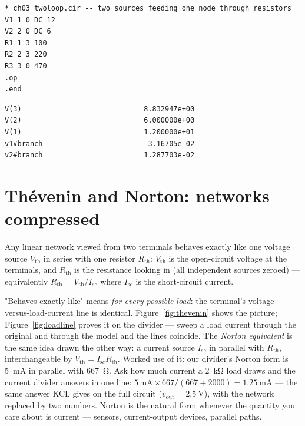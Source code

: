 \begin{lstlisting}[language={},caption={\texttt{code/ch03\_twoloop.cir} — the two-source network of Example~\ref{ex:twoloop}.},label=lst:twoloopcir]
* ch03_twoloop.cir -- two sources feeding one node through resistors
V1 1 0 DC 12
V2 2 0 DC 6
R1 1 3 100
R2 2 3 220
R3 3 0 470
.op
.end
\end{lstlisting}

\begin{lstlisting}[language={},caption={ngspice output of \texttt{code/ch03\_twoloop.cir}, verbatim (simulation S2).},label=lst:twoloopop]
V(3)                             8.832947e+00
V(2)                             6.000000e+00
V(1)                             1.200000e+01
v1#branch                        -3.16705e-02
v2#branch                        1.287703e-02
\end{lstlisting}

\section{Th\'evenin and Norton: networks compressed}
\label{sec:thevenin}

\begin{definition}
Any linear network viewed from two terminals behaves exactly like one voltage
source $V_{\mathrm{th}}$ in series with one resistor $R_{\mathrm{th}}$:
$V_{\mathrm{th}}$ is the open-circuit voltage at the terminals, and
$R_{\mathrm{th}}$ is the resistance looking in (all independent sources
zeroed) — equivalently $R_{\mathrm{th}} = V_{\mathrm{th}}/I_{\mathrm{sc}}$
where $I_{\mathrm{sc}}$ is the short-circuit current.
\end{definition}

"Behaves exactly like" means \emph{for every possible load}: the terminal's
voltage-versus-load-current line is identical. Figure~\ref{fig:thevenin}
shows the picture; Figure~\ref{fig:loadline} proves it on the divider —
sweep a load current through the original and through the model and the lines
coincide. The \emph{Norton equivalent} is the same
idea drawn the other way: a current source $I_{\mathrm{sc}}$ in parallel with
$R_{\mathrm{th}}$, interchangeable by $V_{\mathrm{th}}=I_{\mathrm{sc}}R_{\mathrm{th}}$.
Worked use of it: our divider's Norton form is \qty{5}{\milli\ampere} in
parallel with \qty{667}{\ohm}. Ask how much current a \qty{2}{\kilo\ohm} load
draws and the current divider answers in one line:
$5\,\mathrm{mA}\times 667/(667+2000) = \qty{1.25}{\milli\ampere}$ — the same
answer KCL gives on the full circuit ($v_{\mathrm{out}}=\qty{2.5}{\volt}$),
with the network replaced by two numbers. Norton is the natural form
whenever the quantity you care about is current — sensors, current-output
devices, parallel paths.


